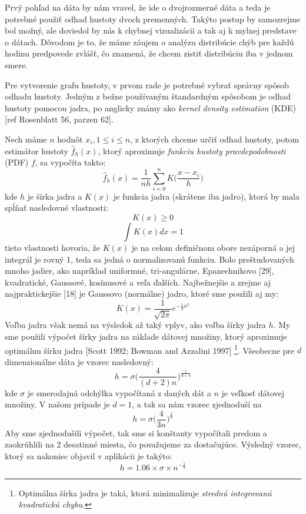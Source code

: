 Prvý pohľad na dáta by nám vravel, že ide o dvojrozmerné dáta a teda je potrebné použiť odhad hustoty dvoch premenných. Takýto postup by samozrejme bol možný, ale doviedol by nás k chybnej vizualizácii a tak aj k mylnej predstave o dátach. Dôvodom je to, že máme záujem o analýzu distribúcie chýb pre každú hodinu predpovede zvlášť, čo znamená, že chcem zistiť distribúciu iba v jednom smere.

Pre vytvorenie grafu hustoty, v prvom rade je potrebné vybrať správny spôsob odhadu hustoty. Jedným z bežne používaným štandardným spôsobom je odhad hustoty pomocou jadra, po anglicky známy ako \textit{kernel density estimation} (KDE) [ref Rosenblatt 56, parzen 62].

Nech máme $ n $ hodnôt $ x_{i}, 1 \leq i \leq n $, z ktorých chceme určiť odhad hustoty, potom estimátor hustoty $ \hat{f}_h(x) $, ktorý aproximuje \textit{funkciu hustoty pravdepodobnosti} (PDF) $ f $, sa vypočíta takto:
\[
	\hat{f}_h(x) = \dfrac{1}{nh} \sum_{i=0}^{n}K\Big(\dfrac{x - x_{i}}{h}\Big)
\]
kde $ h $ je šírka jadra a $ K(x) $ je funkcia jadra (skrátene iba jadro), ktorá by mala spĺňať nasledovné vlastnosti:
\[  K(x) \geq 0 \]
\[  \int K(x) dx = 1 \]
tieto vlastnosti hovoria, že $ K(x) $ je na celom definičnom obore nezáporná a jej integrál je rovný 1, teda sa jedná o normalizovanú funkciu. Bolo preštudovaných mnoho jadier, ako napríklad uniformné, tri-angulárne, Epanechnikovo [29], kvadratické, Gaussové, kosínusové a veľa ďalších. Najbežnejšie a zrejme aj najpraktickejšie [18] je Gaussovo (normálne) jadro, ktoré sme použili aj my:
\[
	K(x) = \dfrac{1}{\sqrt{2\pi}}e^{-\frac{1}{2}x^2}
\]
Voľba jadra však nemá na výsledok až taký vplyv, ako voľba šírky jadra $ h $. My sme použili výpočet šírky jadra na základe dátovej množiny, ktorý aproximuje optimálnu šírku jadra [Scott 1992; Bowman and Azzalini 1997] \footnote{Optimálna šírka jadra je taká, ktorá minimalizuje \textit{strednú integrovanú kvadratickú chybu}.}. Všeobecne pre $ d $ dimenzionálne dáta je vzorec nasledovný:
\[
	h = \sigma \Big(\frac{4}{(d + 2)n}\Big)^{\frac{1}{d+4}}
\]
kde $ \sigma $ je smerodajná odchýlka vypočítaná z daných dát a $ n $ je veľkosť dátovej množiny. V našom prípade je $ d = 1 $, a tak sa nám vzorec zjednoduší na
\[
	h = \sigma \Big(\dfrac{4}{3n}\Big)^{\frac{1}{5}}
\] 
Aby sme zjednodušili výpočet, tak sme si konštanty vypočítali predom a zaokrúhlili na 2 desatinné miesta, čo považujeme za dostačujúce. Výsledný vzorec, ktorý sa nakoniec objavil v aplikácii je takýto:
\[
	h = 1.06 \times \sigma \times n^{-\frac{1}{5}}
\]

